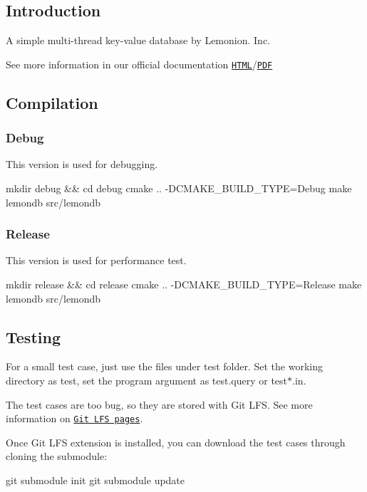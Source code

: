 \subsection*{Introduction}

A simple multi-\/thread key-\/value database by Lemonion. Inc.

See more information in our official documentation \href{https://tc-imba.github.io/VE482-p2/html}{\tt H\+T\+ML}/\href{https://tc-imba.github.io/VE482-p2/latex/refman.pdf}{\tt P\+DF}

\subsection*{Compilation}

\subsubsection*{Debug}

This version is used for debugging. 
\begin{DoxyCode}
mkdir debug && cd debug
cmake ..  -DCMAKE\_BUILD\_TYPE=Debug
make lemondb
src/lemondb
\end{DoxyCode}


\subsubsection*{Release}

This version is used for performance test. 
\begin{DoxyCode}
mkdir release && cd release
cmake ..  -DCMAKE\_BUILD\_TYPE=Release
make lemondb
src/lemondb
\end{DoxyCode}


\subsection*{Testing}

For a small test case, just use the files under {\ttfamily test} folder. Set the working directory as {\ttfamily test}, set the program argument as {\ttfamily test.\+query} or {\ttfamily test$\ast$.in}.

The test cases are too bug, so they are stored with Git L\+FS. See more information on \href{https://git-lfs.github.com/}{\tt Git L\+FS pages}.

Once Git L\+FS extension is installed, you can download the test cases through cloning the submodule\+: 
\begin{DoxyCode}
git submodule init
git submodule update
\end{DoxyCode}


